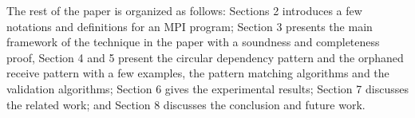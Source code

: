 
The rest of the paper is organized as follows: Sections 2 introduces a few notations and definitions for an MPI program; Section 3 presents the main framework of the technique in the paper with a soundness and completeness proof, Section 4 and 5 present the circular dependency pattern and the orphaned receive pattern with a few examples, the pattern matching algorithms and the validation algorithms; Section 6 gives the experimental results; Section 7 discusses the related work; and Section 8 discusses the conclusion and future work.
